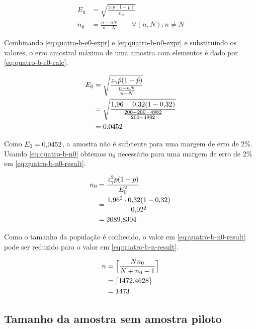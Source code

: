 	\begin{align}
		E_0 &= \label{eq:quatro-b-e0-expr}
			   \sqrt{\frac{z_\gamma p(1 - p) }{n_0}} \\
		n_0 &= \label{eq:quatro-b-n0-expr}
			   \frac{n-n N}{n-N} \qquad \forall (n, N) : n \neq N
	\end{align}

	Combinando \eqref{eq:quatro-b-e0-expr} e \eqref{eq:quatro-b-n0-expr} e
	substituindo os valores, o erro amostral máximo de uma amostra com
	\QUATROn elementos é dado por \eqref{eq:quatro-b-e0-calc}.

	\begin{align}
		\label{eq:quatro-b-e0-calc}
		E_0 &= \sqrt{\frac{z_\gamma \hat{p}(1 - \hat{p}) }{\frac{n-n N}{n - N}}} \\
			&= \sqrt{\frac{\num{1.96} \;\cdot\; \num{0.32} (1 - \num{0.32}) }{\frac{200 - 200 \;\cdot\; 4982}{200 - 4982}}} \nonumber \\
			&= \num{0.0452} \nonumber
	\end{align}

	Como $E_0 = \num{0.0452}$, a amostra não é suficiente para uma margem de
	erro de 2\%. Usando \eqref{eq:quatro-b-n0} obtemos $n_0$ necessário para
	uma margem de erro de 2\% em \eqref{eq:quatro-b-n0-result}.

	\begin{align}
		n_0 &= \frac{z_\gamma^2 p(1-p)}{E_0^2} \nonumber \\
			&= \frac{\num{1.96}^2 \cdot \num{0.32}(1-\num{0.32})}{\num{0.02}^2} \nonumber \\
			&= \label{eq:quatro-b-n0-result}
			   \num{2089.8304}	
	\end{align}

	Como o tamanho da população é conhecido, o valor em
	\eqref{eq:quatro-b-n0-result} pode ser reduzido para o valor em
	\eqref{eq:quatro-b-n-result}.

	\begin{align}
		n &= \Big\lceil \frac{N n_0}{N + n_0 - 1} \nonumber \Big\rceil \\
		  &= \lceil \num{1472.4628} \nonumber \rceil \\
		  &= \label{eq:quatro-b-n-result} 1473
	\end{align}

\subsection{Tamanho da amostra sem amostra piloto}

